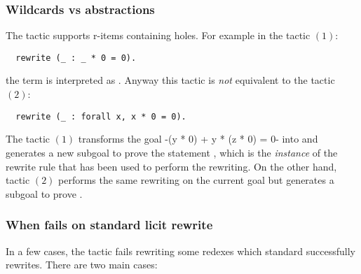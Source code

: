\subsubsection*{Wildcards vs abstractions}
     The  tactic supports r-items containing holes. For example
      in the tactic $(1)$:
\begin{lstlisting}
  rewrite (_ : _ * 0 = 0).
\end{lstlisting}
      the term  is interpreted as .
      Anyway this tactic is \emph{not} equivalent to the tactic $(2)$:
\begin{lstlisting}
  rewrite (_ : forall x, x * 0 = 0).
\end{lstlisting}
      The tactic $(1)$ transforms the goal
      \ssrL-(y * 0) + y * (z * 0) = 0- into 
      and generates a new subgoal to prove the statement ,
      which is the \emph{instance} of the\\ 
      rewrite rule that
      has been used to perform the rewriting. On the other hand, tactic
      $(2)$ performs the same rewriting on the current goal but generates a
      subgoal to prove .

\subsubsection*{When \ssr{}  fails on standard \Coq{} licit rewrite}
In a few cases, the \ssr{}  tactic fails
rewriting some redexes which standard \Coq{} successfully rewrites.
There are two main cases:

